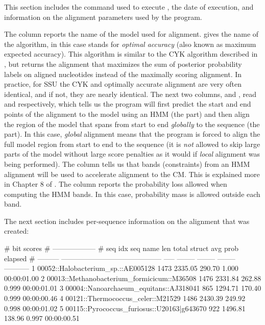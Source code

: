 This section includes the command used to execute , the
date of execution, and information on the alignment parameters used by
the program.

The  column reports the name of the model used for
alignment.  gives the name of the algorithm, in this
case  stands for \emph{optimal accuracy} \cite{Holmes98}
(also known as maximum expected accuracy). This algorithm is similar
to the CYK algorithm described in \cite{Nawrocki09b}, but returns the
alignment that maximizes the sum of posterior probability labels on
aligned nucleotides instead of the maximally scoring alignment. In
practice, for SSU the CYK and optimally accurate alignment are very often
identical, and if not, they are nearly identical.  The next two
columns,  and , read  and
 respectively, which tells us the program will first predict
the start and end points of the alignment to the model using an HMM
(the  part) and then align the region of the model that
spans from start to end \emph{globally} to the sequence (the
 part). In this case, \emph{global} alignment means that
the program is forced to align the full model region from start to end
to the sequence (it is \emph{not} allowed to skip large parts of the
model without large score penalties as it would if \emph{local}
alignment was being performed). The  column tells us that
bands (constraints) from an HMM alignment will be used to accelerate
alignment to the CM. This is explained more in Chapter 8 of
\cite{Nawrocki09b}. The  column reports the probability loss
allowed when computing the HMM bands. In this case, 
probability mass is allowed outside each band.

The next section includes per-sequence information on the alignment
that was created:

\begin{sreoutputwide}
#                                                                  bit scores                            
#                                                               ------------------                       
#   seq idx  seq name                                      len     total    struct  avg prob      elapsed
# ---------  ------------------------------------------  -----  --------  --------  --------  -----------
          1  00052::Halobacterium_sp.::AE005128           1473   2335.05    290.70     1.000  00:00:01.00
          2  00013::Methanobacterium_formicicum::M36508   1476   2331.84    262.88     0.999  00:00:01.01
          3  00004::Nanoarchaeum_equitans::AJ318041        865   1294.71    170.40     0.999  00:00:00.46
          4  00121::Thermococcus_celer::M21529            1486   2430.39    249.92     0.998  00:00:01.02
          5  00115::Pyrococcus_furiosus::U20163|g643670    922   1496.81    138.96     0.997  00:00:00.51
\end{sreoutputwide}

